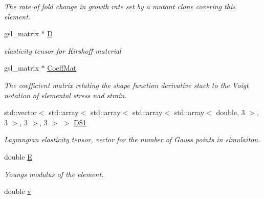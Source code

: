 \begin{DoxyCompactItemize}
\begin{DoxyCompactList}\small\item\em The rate of fold change in growth rate set by a mutant clone covering this element. \end{DoxyCompactList}\item 
\hypertarget{classShapeBase_a1878efccfc629e53748e8907386825b0}{}gsl\+\_\+matrix $\ast$ \hyperlink{classShapeBase_a1878efccfc629e53748e8907386825b0}{D}\label{classShapeBase_a1878efccfc629e53748e8907386825b0}

\begin{DoxyCompactList}\small\item\em elasticity tensor for Kirshoff material \end{DoxyCompactList}\item 
\hypertarget{classShapeBase_a7266beef6c849298c3786a53259bd467}{}gsl\+\_\+matrix $\ast$ \hyperlink{classShapeBase_a7266beef6c849298c3786a53259bd467}{Coeff\+Mat}\label{classShapeBase_a7266beef6c849298c3786a53259bd467}

\begin{DoxyCompactList}\small\item\em The coefficient matrix relating the shape function derivative stack to the Voigt notation of elemental stress nad strain. \end{DoxyCompactList}\item 
\hypertarget{classShapeBase_ad90cb382c78aa293d53bb027f84fe04b}{}std\+::vector$<$ std\+::array$<$ std\+::array$<$ std\+::array$<$ std\+::array$<$ double, 3 $>$, 3 $>$, 3 $>$, 3 $>$ $>$ \hyperlink{classShapeBase_ad90cb382c78aa293d53bb027f84fe04b}{D81}\label{classShapeBase_ad90cb382c78aa293d53bb027f84fe04b}

\begin{DoxyCompactList}\small\item\em Lagrangian elasticity tensor, vector for the number of Gauss points in simulaiton. \end{DoxyCompactList}\item 
\hypertarget{classShapeBase_a6c1a3a0173841d6072a5268978463ff2}{}double \hyperlink{classShapeBase_a6c1a3a0173841d6072a5268978463ff2}{E}\label{classShapeBase_a6c1a3a0173841d6072a5268978463ff2}

\begin{DoxyCompactList}\small\item\em Young\textquotesingle{}s modulus of the element. \end{DoxyCompactList}\item 
\hypertarget{classShapeBase_a8b4c2d3bfbc6c9785c5181a56f929151}{}double \hyperlink{classShapeBase_a8b4c2d3bfbc6c9785c5181a56f929151}{v}\label{classShapeBase_a8b4c2d3bfbc6c9785c5181a56f929151}


\end{DoxyCompactItemize}
